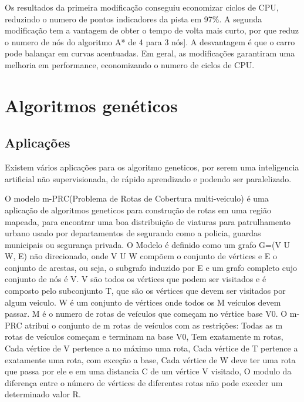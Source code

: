 Os resultados da primeira modificação conseguiu economizar ciclos de CPU, reduzindo o numero de pontos indicadores da pista em 97\%. A segunda modificação tem a vantagem de obter o tempo de volta mais curto, por que reduz o numero de nós do algoritmo A* de 4 para 3 nós]. A desvantagem é que o carro pode balançar em curvas acentuadas. Em geral, as modificações garantiram uma melhoria em performance, economizando o numero de ciclos de CPU.

\section{Algoritmos genéticos}


\subsection{Aplicações}
Existem vários aplicações para os algoritmo geneticos, por serem uma inteligencia artificial não supervisionada, de rápido aprendizado e podendo ser paralelizado.

O modelo m-PRC(Problema de Rotas de Cobertura multi-veiculo) é uma aplicação de algoritmos geneticos para construção de rotas em uma região mapeada, para encontrar uma boa distribuição de viaturas para patrulhamento urbano usado por departamentos de segurando como a policia, guardas municipais ou segurança privada. 
O Modelo é definido como um grafo G=(V U W, E) não direcionado, onde V U W compõem o conjunto de vértices e E o conjunto de arestas, ou seja, o subgrafo induzido por E e um grafo completo cujo conjunto de nós é V. 
V são todos os vértices que podem ser visitados e é composto pelo subconjunto T, que são os vértices que devem ser visitados por algum veiculo. W é um conjunto de vértices onde todos os M veículos devem passar. M é o numero de rotas de veículos que começam no vértice base V0. O m-PRC atribui o conjunto de m rotas de veículos com as restrições: Todas as m rotas de veículos começam e terminam na base V0, Tem exatamente m rotas, Cada vértice de V pertence a no máximo uma rota, Cada vértice de T pertence a exatamente uma rota, com exceção a base, Cada vértice de W deve ter uma rota que passa por ele e em uma distancia C de um vértice V visitado, O modulo da diferença entre o número de vértices de diferentes rotas não pode exceder um determinado valor R.

